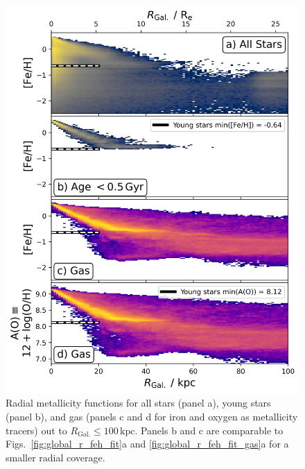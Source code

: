 \documentclass[twocolumn,apj,numberedappendix,appendixfloats,twocolappendix]{openjournal}
\begin{document}
\begin{CJK*}{UTF8}{gbsn}
\begin{figure}
    \centering
    \includegraphics[width=\columnwidth]{figures/trace_stars_and_gas_100kpc.png}
    \caption{Radial metallicity functions for all stars (panel a), young stars (panel b), and gas (panels c and d for iron and oxygen as metallicity tracers) out to $R_\mathrm{Gal.} \leq 100\,\mathrm{kpc}$. Panels b and c are comparable to Figs.~\ref{fig:global_r_feh_fit}a and \ref{fig:global_r_feh_fit_gas}a for a smaller radial coverage.}
    \label{fig:trace_stars_and_gas_100kpc}
\end{figure}


\end{CJK*}
\end{document}
